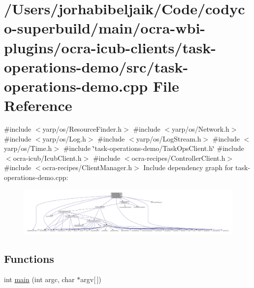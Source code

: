 \hypertarget{task-operations-demo_8cpp}{}\section{/\+Users/jorhabibeljaik/\+Code/codyco-\/superbuild/main/ocra-\/wbi-\/plugins/ocra-\/icub-\/clients/task-\/operations-\/demo/src/task-\/operations-\/demo.cpp File Reference}
\label{task-operations-demo_8cpp}
{\ttfamily \#include $<$yarp/os/\+Resource\+Finder.\+h$>$}\newline
{\ttfamily \#include $<$yarp/os/\+Network.\+h$>$}\newline
{\ttfamily \#include $<$yarp/os/\+Log.\+h$>$}\newline
{\ttfamily \#include $<$yarp/os/\+Log\+Stream.\+h$>$}\newline
{\ttfamily \#include $<$yarp/os/\+Time.\+h$>$}\newline
{\ttfamily \#include \char`\"{}task-\/operations-\/demo/\+Task\+Ops\+Client.\+h\char`\"{}}\newline
{\ttfamily \#include $<$ocra-\/icub/\+Icub\+Client.\+h$>$}\newline
{\ttfamily \#include $<$ocra-\/recipes/\+Controller\+Client.\+h$>$}\newline
{\ttfamily \#include $<$ocra-\/recipes/\+Client\+Manager.\+h$>$}\newline
Include dependency graph for task-\/operations-\/demo.cpp\+:\nopagebreak
\begin{figure}[H]
\begin{center}
\leavevmode
\includegraphics[width=350pt]{task-operations-demo_8cpp__incl}
\end{center}
\end{figure}
\subsection*{Functions}
\begin{DoxyCompactItemize}
\item 
int \hyperlink{task-operations-demo_8cpp_a0ddf1224851353fc92bfbff6f499fa97}{main} (int argc, char $\ast$argv\mbox{[}$\,$\mbox{]})
\end{DoxyCompactItemize}


